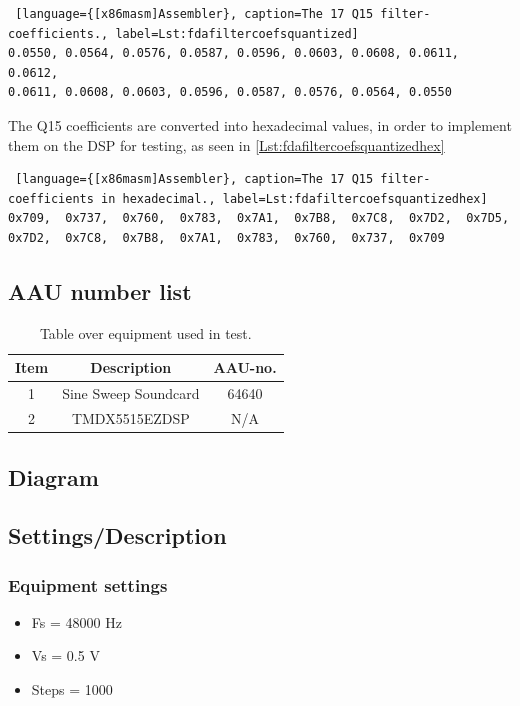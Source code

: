 \begin{lstlisting} [language={[x86masm]Assembler}, caption=The 17 Q15 filter-coefficients., label=Lst:fdafiltercoefsquantized]
0.0550,	0.0564,	0.0576,	0.0587,	0.0596,	0.0603,	0.0608,	0.0611,	0.0612,
0.0611,	0.0608,	0.0603,	0.0596,	0.0587,	0.0576,	0.0564,	0.0550
\end{lstlisting}

The Q15 coefficients are converted into hexadecimal values, in order to implement them on the DSP for testing, as seen in \autoref{Lst:fdafiltercoefsquantizedhex} 

\begin{lstlisting} [language={[x86masm]Assembler}, caption=The 17 Q15 filter-coefficients in hexadecimal., label=Lst:fdafiltercoefsquantizedhex]
0x709,	0x737,	0x760,	0x783,	0x7A1,	0x7B8,	0x7C8,	0x7D2,	0x7D5,
0x7D2,	0x7C8,	0x7B8,	0x7A1,	0x783,	0x760,	0x737,	0x709
\end{lstlisting}


\subsection{AAU number list}
\begin{table}[H]
	\centering
	\begin{tabular}{ c c c } \toprule
		{Item}	& {Description} & {AAU-no}. \\ \bottomrule 
		1	&	Sine Sweep Soundcard	& 64640		\\
		2	&	TMDX5515EZDSP	&	N/A		\\ 
		\bottomrule
	\end{tabular}
	\caption{Table over equipment used in test.}
	\label{tab:UsedEquipmentListningFIRTest}
\end{table}

\subsection{Diagram}



\subsection{Settings/Description}
\subsubsection{Equipment settings}
\label{Eqp_Sett_FIR}
\begin{itemize}
	\item Fs = 48000 Hz
	\item Vs = 0.5 V
	\item Steps = 1000
\end{itemize}

